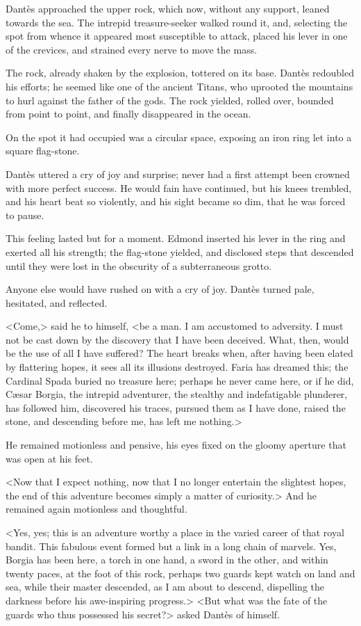  Dantès approached the upper rock, which now, without any support, leaned towards the sea. The intrepid treasure-seeker walked round it, and, selecting the spot from whence it appeared most susceptible to attack, placed his lever in one of the crevices, and strained every nerve to move the mass. 

 The rock, already shaken by the explosion, tottered on its base. Dantès redoubled his efforts; he seemed like one of the ancient Titans, who uprooted the mountains to hurl against the father of the gods. The rock yielded, rolled over, bounded from point to point, and finally disappeared in the ocean. 

 On the spot it had occupied was a circular space, exposing an iron ring let into a square flag-stone. 

 Dantès uttered a cry of joy and surprise; never had a first attempt been crowned with more perfect success. He would fain have continued, but his knees trembled, and his heart beat so violently, and his sight became so dim, that he was forced to pause. 

 This feeling lasted but for a moment. Edmond inserted his lever in the ring and exerted all his strength; the flag-stone yielded, and disclosed steps that descended until they were lost in the obscurity of a subterraneous grotto. 

 Anyone else would have rushed on with a cry of joy. Dantès turned pale, hesitated, and reflected. 

 <Come,> said he to himself, <be a man. I am accustomed to adversity. I must not be cast down by the discovery that I have been deceived. What, then, would be the use of all I have suffered? The heart breaks when, after having been elated by flattering hopes, it sees all its illusions destroyed. Faria has dreamed this; the Cardinal Spada buried no treasure here; perhaps he never came here, or if he did, Cæsar Borgia, the intrepid adventurer, the stealthy and indefatigable plunderer, has followed him, discovered his traces, pursued them as I have done, raised the stone, and descending before me, has left me nothing.> 

 He remained motionless and pensive, his eyes fixed on the gloomy aperture that was open at his feet. 

 <Now that I expect nothing, now that I no longer entertain the slightest hopes, the end of this adventure becomes simply a matter of curiosity.> And he remained again motionless and thoughtful. 

 <Yes, yes; this is an adventure worthy a place in the varied career of that royal bandit. This fabulous event formed but a link in a long chain of marvels. Yes, Borgia has been here, a torch in one hand, a sword in the other, and within twenty paces, at the foot of this rock, perhaps two guards kept watch on land and sea, while their master descended, as I am about to descend, dispelling the darkness before his awe-inspiring progress.>  <But what was the fate of the guards who thus possessed his secret?> asked Dantès of himself. 

